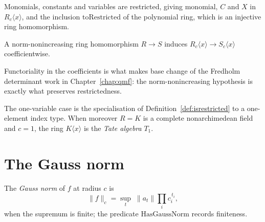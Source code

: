 
\begin{definition}
  \label{def:restricted-elements}
  \leanok
  Monomials, constants and variables are restricted, giving $\mathrm{monomial}$, $C$ and $X$ in
  $R_c\langle x\rangle$, and the inclusion $\mathrm{toRestricted}$ of the polynomial ring, which
  is an injective ring homomorphism.
\end{definition}

\begin{definition}
  \label{def:restricted-map}
  \leanok
  A norm-nonincreasing ring homomorphism $R \to S$ induces $R_c\langle x\rangle \to S_c\langle
  x\rangle$ coefficientwise.
\end{definition}

Functoriality in the coefficients is what makes base change of the Fredholm determinant work in
Chapter~\ref{chap:qmf}: the norm-nonincreasing hypothesis is exactly what preserves
restrictedness.

\begin{definition}
  \label{def:tate-algebra}
  \leanok
  The one-variable case is the specialisation of Definition~\ref{def:isrestricted} to a
  one-element index type.  When moreover $R = K$ is a complete nonarchimedean field and $c = 1$,
  the ring $K\langle x \rangle$ is the \emph{Tate algebra} $T_1$.
\end{definition}


\section{The Gauss norm}

\begin{definition}
  \label{def:gaussnorm}
  \leanok
  The \emph{Gauss norm} of $f$ at radius $c$ is
  \[
    \lVert f \rVert_c = \sup_t \; \lVert a_t \rVert \prod_i c_i^{\,t_i},
  \]
  when the supremum is finite; the predicate $\mathrm{HasGaussNorm}$ records finiteness.
\end{definition}

